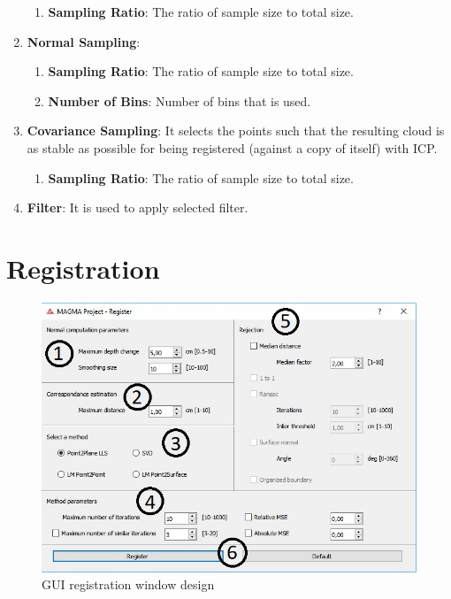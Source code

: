 \documentclass[aps,letterpaper,11pt]{revtex4}
\begin{document}
\begin{enumerate}
\begin{enumerate}
 \item \textbf{Sampling Ratio}: The ratio of sample size to total size.
\end{enumerate}
 \item \textbf{Normal Sampling}: 
\begin{enumerate}
 \item \textbf{Sampling Ratio}: The ratio of sample size to total size.
 \item \textbf{Number of Bins}: Number of bins that is used.
\end{enumerate}
 \item \textbf{Covariance Sampling}: It selects the points such that the resulting cloud is as stable as possible for being registered (against a copy of itself) with ICP.
\begin{enumerate}
 \item \textbf{Sampling Ratio}: The ratio of sample size to total size.
\end{enumerate}
 \item \textbf{Filter}: It is used to apply selected filter.
\end{enumerate}


\section{Registration}

\begin{figure}[H]
	\centering
	\includegraphics[width=15cm]{Gui_regist_1.jpg}
	\caption{GUI registration window design}
	\label{fig: GlobalDesignNumbers}    
\end{figure}
\end{document}
